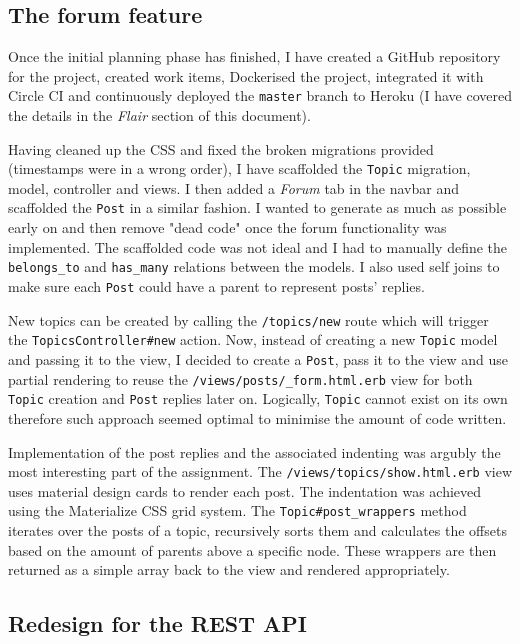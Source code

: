\documentclass[a4paper, 11pt, titlepage]{article}
\begin{document}
\subsection{The forum feature}
Once the initial planning phase has finished, I have created a GitHub repository for the project,
created work items, Dockerised the project, integrated it with Circle CI and continuously deployed the \texttt{master}
branch to Heroku (I have covered the details in the \textit{Flair} section of this document).

Having cleaned up the CSS and fixed the broken migrations provided (timestamps were in a wrong order),
I have scaffolded the \texttt{Topic} migration, model, controller and views. I then added a
\textit{Forum} tab in the navbar and scaffolded the \texttt{Post} in a similar fashion. I wanted
to generate as much as possible early on and then remove "dead code" once the forum functionality
was implemented. The scaffolded code was not ideal and I had to manually define the \texttt{belongs\_to}
and \texttt{has\_many} relations between the models. I also used self joins to make sure each \texttt{Post}
could have a parent to represent posts' replies.

New topics can be created by calling the \texttt{/topics/new} route which will trigger the \texttt{TopicsController\#new}
action. Now, instead of creating a new \texttt{Topic} model and passing it to the view, I decided to create
a \texttt{Post}, pass it to the view and use partial rendering to reuse the \texttt{/views/posts/\_form.html.erb}
view for both \texttt{Topic} creation and \texttt{Post} replies later on. Logically, \texttt{Topic} cannot exist on its own
therefore such approach seemed optimal to minimise the amount of code written.

Implementation of the post replies and the associated indenting was argubly the most interesting
part of the assignment. The \texttt{/views/topics/show.html.erb} view uses material design cards to
render each post. The indentation was achieved using the Materialize CSS\cite{1} grid system.
The \texttt{Topic\#post\_wrappers} method iterates over the posts of a topic, recursively sorts
them and calculates the offsets based on the amount of parents above a specific node. These wrappers
are then returned as a simple array back to the view and rendered appropriately.

\subsection{Redesign for the REST API}
\end{document}
